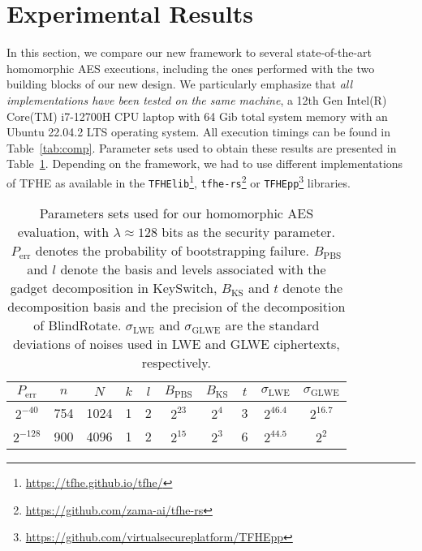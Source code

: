\section{Experimental Results}
\label{sec:comparison}

In this section, we compare our new framework to several state-of-the-art homomorphic AES executions, including the ones performed with the two building blocks of our new design.
We particularly emphasize that \textit{all implementations have been tested on the same machine}, a 12th Gen Intel(R) Core(TM) i7-12700H CPU laptop with 64 Gib total system memory with an Ubuntu 22.04.2 LTS operating system. All execution timings can be found in Table~\ref{tab:comp}.
Parameter sets used to obtain these results are presented in Table~\ref{tab:params}.
Depending on the framework, we had to use different implementations of TFHE as available in the \texttt{TFHElib}\footnote{\url{https://tfhe.github.io/tfhe/}}, \texttt{tfhe-rs}\footnote{\url{https://github.com/zama-ai/tfhe-rs}} or \texttt{TFHEpp}\footnote{\url{https://github.com/virtualsecureplatform/TFHEpp}} libraries.


\begin{table}[htbp]

\caption{Parameters sets used for our homomorphic AES evaluation, with $\lambda\approx128$ bits as the security parameter. $P_{\text{err}}$ denotes the probability of bootstrapping failure. $B_\text{PBS}$ and $l$ denote the basis and levels associated with the gadget decomposition in \textsf{KeySwitch}, $B_\text{KS}$ and $t$ denote the decomposition basis and the precision of the decomposition of \textsf{BlindRotate}. $\sigma_\text{LWE}$ and $\sigma_\text{GLWE}$ are the standard deviations of noises used in LWE and GLWE ciphertexts, respectively.}
\label{tab:params}
\begin{adjustbox}{center}
\begin{tabular}{|c||c|c|c|c|c|c|c|c|c|}
\hline
 $P_{\text{err}}$ &  $n$   & $N$ & $k$   & $l$ & $B_\text{PBS}$ & $B_\text{KS}$ & $t$ & $\sigma_\text{LWE}$ & $\sigma_\text{GLWE}$ \\ \hline
  $2^{-40}$ & 754     &    1024  & 1  &  2   &    $2^{23}$   &   $2^4$     &   3  &  $2^{46.4}$       &    $2^{16.7}$       \\ \hline  
    $2^{-128}$ &   900    &   4096   & 1  &   2  &   $2^{15}$   &    $2^3$    &  6 &    $2^{44.5}$      &    $2^2$      \\ \hline  
\end{tabular}
\end{adjustbox}
\end{table}

